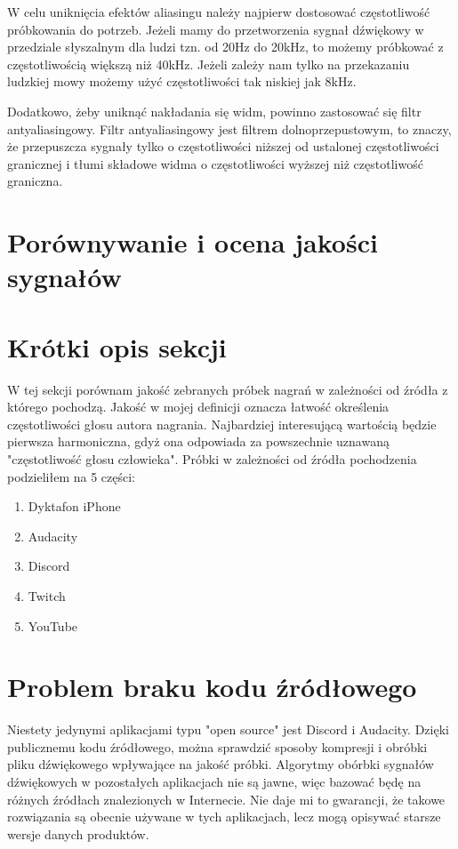 \documentclass[a4paper,12pt]{extarticle}
\begin{document}
W celu uniknięcia efektów aliasingu należy najpierw dostosować częstotliwość próbkowania do potrzeb. Jeżeli mamy do przetworzenia sygnał dźwiękowy w przedziale słyszalnym dla ludzi tzn. od 20Hz do 20kHz, to możemy próbkować z częstotliwością większą niż 40kHz. Jeżeli zależy nam tylko na przekazaniu ludzkiej mowy możemy użyć częstotliwości tak niskiej jak 8kHz.

Dodatkowo, żeby uniknąć nakładania się widm, powinno zastosować się filtr antyaliasingowy. Filtr antyaliasingowy jest filtrem dolnoprzepustowym, to znaczy, że przepuszcza sygnały tylko o częstotliwości niższej od ustalonej częstotliwości granicznej i tłumi składowe widma o częstotliwości wyższej niż częstotliwość graniczna.


\newpage

\section{Porównywanie i ocena jakości sygnałów}
\label{sec:jakosc}

\section*{Krótki opis sekcji}

W tej sekcji porównam jakość zebranych próbek nagrań w zależności od źródła z którego pochodzą. Jakość w mojej definicji oznacza łatwość określenia częstotliwości głosu autora nagrania. Najbardziej interesującą wartością będzie pierwsza harmoniczna, gdyż ona odpowiada za powszechnie uznawaną "częstotliwość głosu człowieka". Próbki w zależności od źródła pochodzenia podzieliłem na 5 części:

\begin{enumerate}
    \item Dyktafon iPhone
    \item Audacity
    \item Discord
    \item Twitch
    \item YouTube
\end{enumerate}

\section*{Problem braku kodu źródłowego}

Niestety jedynymi aplikacjami typu "open source" jest Discord i Audacity. Dzięki publicznemu kodu źródłowego, można sprawdzić sposoby kompresji i obróbki pliku dźwiękowego wpływające na jakość próbki. Algorytmy obórbki sygnałów dźwiękowych w pozostałych aplikacjach nie są jawne, więc bazować będę na różnych źródłach znalezionych w Internecie. Nie daje mi to gwarancji, że takowe rozwiązania są obecnie używane w tych aplikacjach, lecz mogą opisywać starsze wersje danych produktów.
\end{document}
